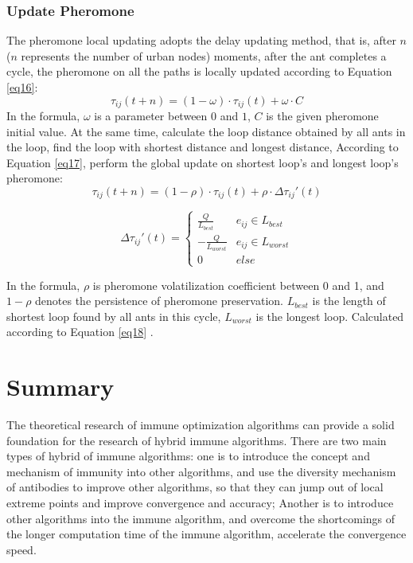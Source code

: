 \documentclass[11pt,a4paper,oldfontcommands]{memoir}
\begin{document}
\subsection{Update Pheromone}
The pheromone local updating adopts the delay updating method, that is, after $n$($n$ represents the number of urban nodes) moments, after the ant completes a cycle, the pheromone on all the paths is locally updated according to Equation \ref {eq16}:
\begin{equation}
\tau_{ij}(t+n) = (1-\omega)\cdot\tau_{ij}(t)+\omega\cdot C
\tag{16} \label {eq16}
\end{equation}
In the formula, $\omega$ is a parameter between $0$ and $1$, $C$ is the given pheromone initial value.
At the same time, calculate the loop distance obtained by all ants in the loop, find the loop with shortest distance and longest distance, According to Equation \ref {eq17}, perform the global update on shortest loop’s and longest loop’s pheromone: 
\begin{equation}
\tau_{ij}(t+n) = (1-\rho)\cdot\tau_{ij}(t)+\rho\cdot \Delta{\tau_{ij}}'(t)
\tag{17} \label {eq17}
\end{equation}

\begin{equation}
\Delta{\tau_{ij}}'(t) = 
\begin{cases}
\frac{Q}{L_{best}} & e_{ij} \in L_{best} \\
-\frac{Q}{L_{worst}} & e_{ij} \in L_{worst} \\
0 & else
\end{cases}
\tag{18} \label {eq18}
\end{equation}

In the formula, $\rho$ is pheromone volatilization coefficient between 0 and 1, and $1-\rho$ denotes the persistence of pheromone preservation. $L_{best}$ is the length of shortest loop found by all ants in this cycle, $L_{worst}$ is the longest loop. Calculated according to Equation \ref {eq18} .

\chapter{Summary}
The theoretical research of immune optimization algorithms can provide a solid foundation for the research of hybrid immune algorithms. There are two main types of hybrid of immune algorithms: one is to introduce the concept and mechanism of immunity into other algorithms, and use the diversity mechanism of antibodies to improve other algorithms, so that they can jump out of local extreme points and improve convergence and accuracy; Another is to introduce other algorithms into the immune algorithm, and overcome the shortcomings of the longer computation time of the immune algorithm, accelerate the convergence speed.
\end{document}
